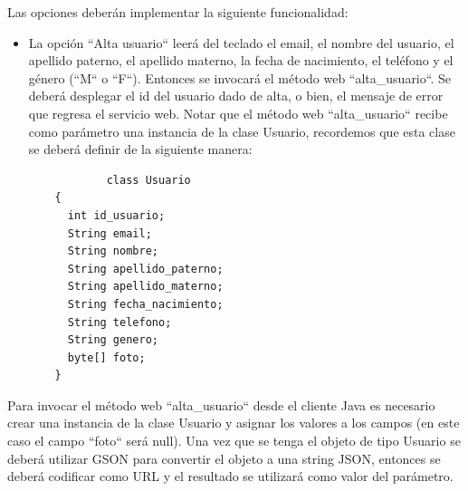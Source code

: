 \documentclass[11pt]{article}
\begin{document}
Las opciones deberán implementar la siguiente funcionalidad:
\begin{itemize}
			\item La opción ``Alta usuario`` leerá del teclado el email, el nombre del usuario, el apellido paterno, el apellido materno, la fecha de nacimiento, el teléfono y el género (``M`` o ``F``). Entonces se invocará el método web ``alta\_usuario``. Se deberá desplegar el id del usuario dado de alta, o bien, el mensaje de error que regresa el servicio web. Notar que el método web ``alta\_usuario`` recibe como parámetro una instancia de la clase Usuario, recordemos que esta clase se deberá definir de la siguiente manera:
			\begin{verbatim}
			class Usuario
    {
      int id_usuario;
      String email;
      String nombre;
      String apellido_paterno;
      String apellido_materno;
      String fecha_nacimiento;
      String telefono;
      String genero;
      byte[] foto;
    }
		\end{verbatim}
		\end{itemize}
Para invocar el método web ``alta\_usuario`` desde el cliente Java es necesario crear una instancia de la clase Usuario y asignar los valores a los campos (en este caso el campo ``foto`` será null). Una vez que se tenga el objeto de tipo Usuario se deberá utilizar GSON para convertir el objeto a una string JSON, entonces se deberá codificar como URL y el resultado se utilizará como valor del parámetro.
\end{document}
